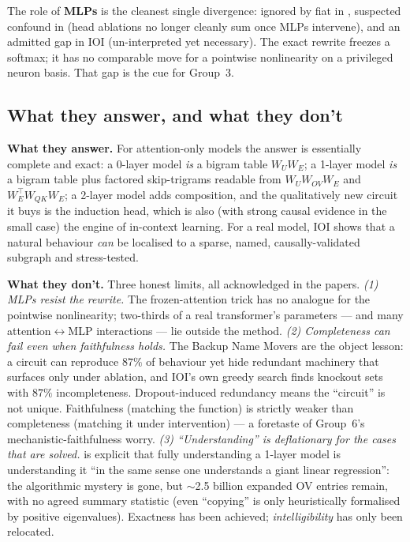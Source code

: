 The role of \textbf{MLPs} is the cleanest single divergence: ignored by fiat in \textcite{framework}, suspected confound in \textcite{induction-heads} (head ablations no longer cleanly sum once MLPs intervene), and an admitted gap in IOI (un-interpreted yet necessary). The exact rewrite freezes a softmax; it has no comparable move for a pointwise nonlinearity on a privileged neuron basis. That gap is the cue for Group~3.

\subsection*{What they answer, and what they don't}

\textbf{What they answer.} For attention-only models the answer is essentially complete and exact: a 0-layer model \emph{is} a bigram table $W_U W_E$; a 1-layer model \emph{is} a bigram table plus factored skip-trigrams readable from $W_U W_{OV}W_E$ and $W_E^{\top}W_{QK}W_E$; a 2-layer model adds composition, and the qualitatively new circuit it buys is the induction head, which is also (with strong causal evidence in the small case) the engine of in-context learning. For a real model, IOI shows that a natural behaviour \emph{can} be localised to a sparse, named, causally-validated subgraph and stress-tested.

\textbf{What they don't.} Three honest limits, all acknowledged in the papers.
\emph{(1) MLPs resist the rewrite.} The frozen-attention trick has no analogue for the pointwise nonlinearity; two-thirds of a real transformer's parameters --- and many attention$\leftrightarrow$MLP interactions --- lie outside the method.
\emph{(2) Completeness can fail even when faithfulness holds.} The Backup Name Movers are the object lesson: a circuit can reproduce $87\%$ of behaviour yet hide redundant machinery that surfaces only under ablation, and IOI's own greedy search finds knockout sets with $87\%$ incompleteness. Dropout-induced redundancy means the ``circuit'' is not unique. Faithfulness (matching the function) is strictly weaker than completeness (matching it under intervention) --- a foretaste of Group~6's mechanistic-faithfulness worry.
\emph{(3) ``Understanding'' is deflationary for the cases that are solved.} \textcite{framework} is explicit that fully understanding a 1-layer model is understanding it ``in the same sense one understands a giant linear regression'': the algorithmic mystery is gone, but $\sim$2.5 billion expanded OV entries remain, with no agreed summary statistic (even ``copying'' is only heuristically formalised by positive eigenvalues). Exactness has been achieved; \emph{intelligibility} has only been relocated.

